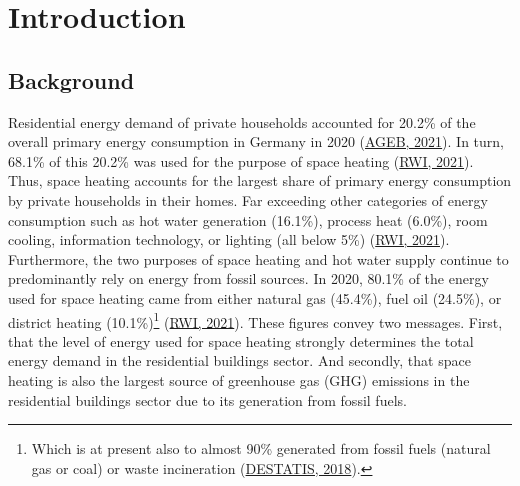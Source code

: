 \documentclass[12pt,twoside]{reedthesis}
\begin{document}
\mainmatter %
\pagestyle{fancyplain} %

\setlength{\parskip}{6pt} %

\hypertarget{introduction}{%
\chapter{Introduction}\label{introduction}}

\hypertarget{background}{%
\section{Background}\label{background}}

Residential energy demand of private households accounted for 20.2\% of the overall primary energy consumption in Germany in 2020 (\protect\hyperlink{ref-ageb21}{AGEB, 2021}). In turn, 68.1\% of this 20.2\% was used for the purpose of space heating (\protect\hyperlink{ref-rwi21}{RWI, 2021}). Thus, space heating accounts for the largest share of primary energy consumption by private households in their homes. Far exceeding other categories of energy consumption such as hot water generation (16.1\%), process heat (6.0\%), room cooling, information technology, or lighting (all below 5\%) (\protect\hyperlink{ref-rwi21}{RWI, 2021}). Furthermore, the two purposes of space heating and hot water supply continue to predominantly rely on energy from fossil sources. In 2020, 80.1\% of the energy used for space heating came from either natural gas (45.4\%), fuel oil (24.5\%), or district heating (10.1\%)\footnote{Which is at present also to almost 90\% generated from fossil fuels (natural gas or coal) or waste incineration (\protect\hyperlink{ref-destatis18}{DESTATIS, 2018}).} (\protect\hyperlink{ref-rwi21}{RWI, 2021}). These figures convey two messages. First, that the level of energy used for space heating strongly determines the total energy demand in the residential buildings sector. And secondly, that space heating is also the largest source of greenhouse gas (GHG) emissions in the residential buildings sector due to its generation from fossil fuels.
\end{document}
